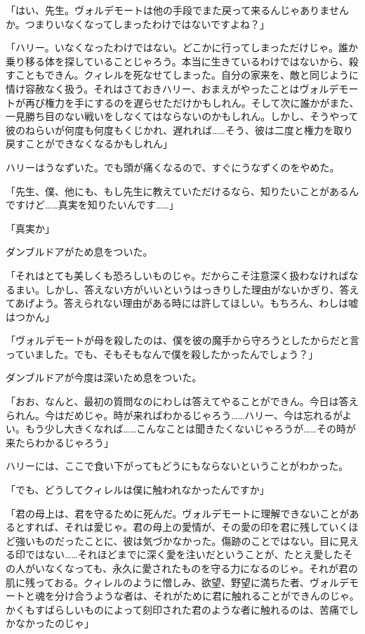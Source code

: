 \documentclass[10pt,a4paper]{article}
\begin{document}
\begin{CJK}{UTF8}{min}
「はい、先生。ヴォルデモートは他の手段でまた戻って来るんじゃありませんか。つまりいなくなってしまったわけではないですよね？」

「ハリー。いなくなったわけではない。どこかに行ってしまっただけじゃ。誰か乗り移る体を探していることじゃろう。本当に生きているわけではないから、殺すこともできん。クィレルを死なせてしまった。自分の家来を、敵と同じように情け容赦なく扱う。それはさておきハリー、おまえがやったことはヴォルデモートが再び権力を手にするのを遅らせただけかもしれん。そして次に誰かがまた、一見勝ち目のない戦いをしなくてはならないのかもしれん。しかし、そうやって彼のねらいが何度も何度もくじかれ、遅れれば……そう、彼は二度と権力を取り戻すことができなくなるかもしれん」

ハリーはうなずいた。でも頭が痛くなるので、すぐにうなずくのをやめた。

「先生、僕、他にも、もし先生に教えていただけるなら、知りたいことがあるんですけど……真実を知りたいんです……」

「真実か」

ダンブルドアがため息をついた。

「それはとても美しくも恐ろしいものじゃ。だからこそ注意深く扱わなければなるまい。しかし、答えない方がいいというはっきりした理由がないかぎり、答えてあげよう。答えられない理由がある時には許してほしい。もちろん、わしは嘘はつかん」

「ヴォルデモートが母を殺したのは、僕を彼の魔手から守ろうとしたからだと言っていました。でも、そもそもなんで僕を殺したかったんでしょう？」

ダンブルドアが今度は深いため息をついた。

「おお、なんと、最初の質問なのにわしは答えてやることができん。今日は答えられん。今はだめじゃ。時が来ればわかるじゃろう……ハリー、今は忘れるがよい。もう少し大きくなれば……こんなことは聞きたくないじゃろうが……その時が来たらわかるじゃろう」

ハリーには、ここで食い下がってもどうにもならないということがわかった。

「でも、どうしてクィレルは僕に触われなかったんですか」

「君の母上は、君を守るために死んだ。ヴォルデモートに理解できないことがあるとすれば、それは愛じゃ。君の母上の愛情が、その愛の印を君に残していくほど強いものだったことに、彼は気づかなかった。傷跡のことではない。目に見える印ではない……それほどまでに深く愛を注いだということが、たとえ愛したその人がいなくなっても、永久に愛されたものを守る力になるのじゃ。それが君の肌に残っておる。クィレルのように憎しみ、欲望、野望に満ちた者、ヴォルデモートと魂を分け合うような者は、それがために君に触れることができんのじゃ。かくもすばらしいものによって刻印された君のような者に触れるのは、苦痛でしかなかったのじゃ」


\end{CJK}
\end{document}
